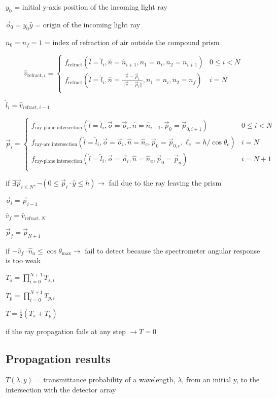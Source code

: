 \documentclass{article}
\begin{document}
$y_0$ = initial y-axis position of the incoming light ray

$\vec{o}_0 = y_0\hat{y}$ = origin of the incoming light ray

$n_0 = n_f = 1$ = index of refraction of air outside the compound prism

\[\hat{v}_{\text{refract}, i} = \begin{cases}
		f_{\text{refract}}(\hat{l}=\hat{l}_i, \hat{n}=\hat{n}_{i+1}, n_1=n_i, n_2=n_{i+1})                                   & 0 \le i < N \\
		f_{\text{refract}}(\hat{l}=\hat{l}_i, \hat{n}=\frac{\vec{c} - \vec{p}_i}{||\vec{c} - \vec{p}_i||}, n_1=n_i, n_2=n_f) & i = N       \\
	\end{cases}\]

$\hat{l}_i = \hat{v}_{\text{refract}, i - 1}$

\[\vec{p}_i = \begin{cases}
		f_{\text{ray-plane intersection}}(\hat{l}=\hat{l}_i, \vec{o}=\vec{o}_i, \hat{n}=\hat{n}_{i+1}, \vec{p}_0=\vec{p}_{0, i+1})                    & 0 \le i < N \\
		f_{\text{ray-arc intersection}}(\hat{l}=\hat{l}_i, \vec{o}=\vec{o}_i, \hat{n}=\hat{n}_c, \vec{p}_0=\vec{p}_{0, c}, \ell_c=h/\cos{\theta_{c}}) & i = N       \\
		f_{\text{ray-plane intersection}}(\hat{l}=\hat{l}_i, \vec{o}=\vec{o}_i, \hat{n}=\hat{n}_{a}, \vec{p}_0=\vec{p}_a)                             & i = N + 1   \\
	\end{cases}\]

if $\exists \vec{p}_{i \le N}, \neg (0 \le \vec{p}_i \cdot \hat{y} \le h) \to$ fail due to the ray leaving the prism

$\vec{o}_i = \vec{p}_{i - 1}$

$\hat{v}_f = \hat{v}_{\text{refract}, N}$

$\vec{p}_f = \vec{p}_{N + 1}$

if $-\hat{v}_f \cdot \hat{n}_a \le \cos{\theta_{\text{max}}} \to$ fail to detect because the spectrometer angular response is too weak

$T_s = \prod_{i=0}^{N + 1} T_{s,i}$

$T_p = \prod_{i=0}^{N + 1} T_{p,i}$

$T = \frac{1}{2} (T_s + T_p)$

if the ray propagation fails at any step $\to T = 0$

\subsection{Propagation results}\label{subsec:propagation-results}
$T(\lambda, y)$ = transmittance probability of a wavelength, $\lambda$, from an initial y, to the intersection with the detector array
\end{document}
